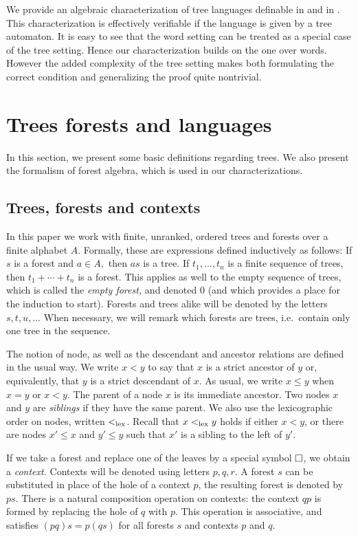 \documentclass{LMCS}
\begin{document}
We provide an algebraic characterization of tree languages definable in \Dtwo
and in \Dtwol. This characterization is effectively verifiable if the language
is given by a tree automaton. It is easy to see that the word setting can be
treated as a special case of the tree setting. Hence our characterization
builds on the one over words.  However the added complexity of the tree setting
makes both formulating the correct condition and generalizing the proof quite
nontrivial.


\section{Trees forests and languages}
In this section, we present some basic definitions regarding trees. We also present the formalism of forest algebra, which is used in  our characterizations.


\subsection{Trees, forests and contexts}
In this paper we work with finite, unranked, ordered trees and forests
over a finite alphabet $A.$ Formally, these are expressions defined
inductively as follows: If $s$ is a forest and $a\in A,$ then $as$ is
a tree.  If $t_1,\ldots,t_n$ is a finite sequence of trees, then
$t_1+\cdots+t_n$ is a forest.  This applies as well to the empty
sequence of trees, which is called the {\it empty forest,} and denoted
0 (and which provides a place for the induction to start).  Forests
and trees alike will be denoted by the letters $s,t,u,\ldots$ When
necessary, we will  remark which forests are trees, i.e.~contain
only one tree in the sequence.



The notion of node, as well as the descendant and ancestor relations are
defined in the usual way. We write $x < y$ to say that $x$ is a strict ancestor of
$y$ or, equivalently, that $y$ is a strict descendant of $x$. As usual, we
write $x \le y$ when $x=y$ or $x < y$.  The parent of a node $x$ is its
immediate ancestor. Two nodes $x$ and $y$ are \emph{siblings} if they have the
same parent.  We also use the lexicographic order on nodes, written $<_\mathrm{lex}$.
Recall that $x <_\mathrm{lex} y$ holds if either $x < y$, or there are nodes $x' \le x$
and $y' \le y$ such that $x'$ is a sibling to the left of $y'$.

If we take a forest and replace one of the leaves by a special symbol
$\Box$, we obtain a \emph{context.}  Contexts will be denoted
using letters $p,q,r$. A forest $s$ can be substituted in place of the
hole of a context $p$, the resulting forest is denoted by $ps$.
 There is a natural composition operation on contexts: the
context $qp$ is formed by replacing the hole of $q$ with $p$.
This operation is associative, and satisfies $(pq)s=p(qs)$ for all
forests $s$ and contexts $p$ and $q$.
\end{document}
